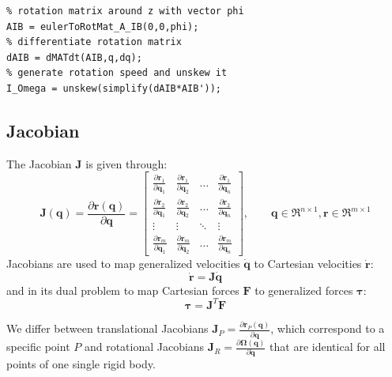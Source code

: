 \begin{lstlisting}
% rotation matrix around z with vector phi
AIB = eulerToRotMat_A_IB(0,0,phi);
% differentiate rotation matrix
dAIB = dMATdt(AIB,q,dq);
% generate rotation speed and unskew it
I_Omega = unskew(simplify(dAIB*AIB'));
\end{lstlisting}


\subsection{Jacobian}\label{sec:jacobian}
The Jacobian $\mathbf{J}$ is given through:
\begin{equation}
\mathbf{J}\left(\mathbf{q}\right) = \frac{\partial \mathbf{r}\left(\mathbf{q}\right)}{\partial\mathbf{q}} = 
\left[
\begin{array}{cccc}
\frac{\partial\mathbf{r}_1}{\partial\mathbf{q}_1} & \frac{\partial\mathbf{r}_1}{\partial\mathbf{q}_2} & \ldots & \frac{\partial\mathbf{r}_1}{\partial\mathbf{q}_n} \\
\frac{\partial\mathbf{r}_2}{\partial\mathbf{q}_1} & \frac{\partial\mathbf{r}_2}{\partial\mathbf{q}_2} & \ldots & \frac{\partial\mathbf{r}_2}{\partial\mathbf{q}_n} \\
\vdots & \vdots & \ddots & \vdots \\
\frac{\partial\mathbf{r}_m}{\partial\mathbf{q}_1} & \frac{\partial\mathbf{r}_m}{\partial\mathbf{q}_2} & \ldots & \frac{\partial\mathbf{r}_m}{\partial\mathbf{q}_n}
\end{array}
\right], 
\qquad {\mathbf{q}}\in \Re^{n\times1}, \mathbf{r}\in\Re^{m\times1}
\end{equation}
Jacobians are used to map generalized velocities $\dot{\mathbf{q}}$ to Cartesian velocities $\dot{\mathbf{r}}$: 
\begin{equation}
\dot{\mathbf{r}} = \mathbf{J}\dot{\mathbf{q}}
\end{equation}
and in its dual problem to map Cartesian forces $\mathbf{F}$ to generalized forces $\boldsymbol{\tau}$:
\begin{equation}
\boldsymbol{\tau} = \mathbf{J}^T\mathbf{F}
\end{equation}

We differ between translational Jacobians $\mathbf{J}_{P} = \frac{\partial \mathbf{r}_{P}\left(\mathbf{q}\right)}{\partial \mathbf{q}}$, which correspond to a specific point $P$ and rotational Jacobians $\mathbf{J}_{R} = \frac{\partial \boldsymbol{\Omega}\left(\mathbf{q}\right)}{\partial \dot{\mathbf{q}}}$ that are identical for all points of one single rigid body.

